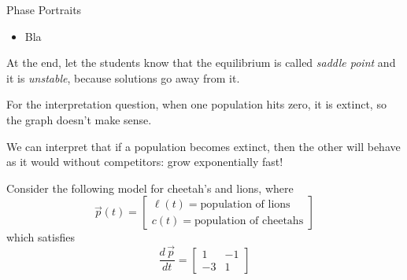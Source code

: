 	





\standardonlynewpage

%
%



\begin{module}{Phase Portraits}
	\label{sys:phase}

	
	
\end{module}



\begin{lesson}

	\begin{itemize}
		\item Bla
	\end{itemize}
	

\end{lesson}




\begin{annotation}
	\begin{goals}
	At the end, let the students know that the equilibrium is called \emph{saddle point} and it is \emph{unstable}, because solutions go away from it.
	
	For the interpretation question, when one population hits zero, it is extinct, so the graph doesn't make sense. 
	
	We can interpret that if a population becomes extinct, then the other will behave as it would without competitors: grow exponentially fast!
	\end{goals}
\end{annotation}
\question
	Consider the following model for cheetah's and lions, where
	$$ \vec{p}(t) = \begin{bmatrix} \ell(t) = \text{population of lions} \\ c(t) = \text{population of cheetahs} \end{bmatrix} $$
	which satisfies
	$$
	\frac{d\,\vec{p}}{dt} = \begin{bmatrix}
 		1 & -1 \\
 		-3 & 1
 	\end{bmatrix}
	$$
	

